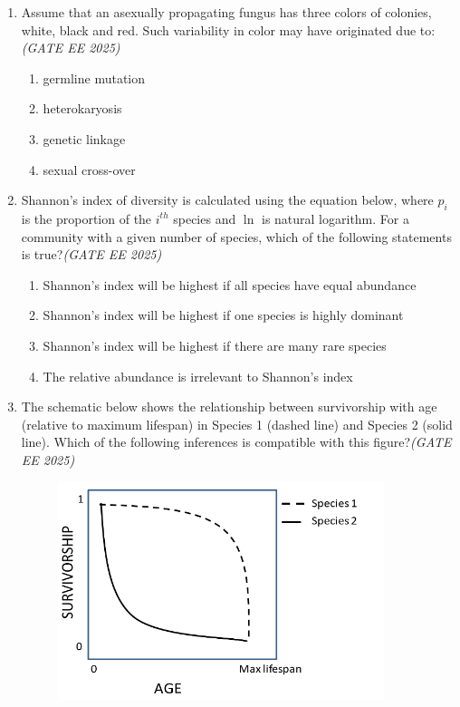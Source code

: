 \documentclass[11pt,a4paper]{article}
\begin{document}
\begin{enumerate}[leftmargin=*,label=\textbf{Q.\arabic*},resume]
\rule{4cm}{0.15mm}

\item Assume that an asexually propagating fungus has three colors of colonies, white, black and red. Such variability in color may have originated due to:\hfill \textit{(GATE EE 2025)}
\begin{multicols}{2}
\begin{enumerate}[label=(\Alph*)]
\item germline mutation
\item heterokaryosis
\item genetic linkage
\item sexual cross-over
\end{enumerate}
\end{multicols}

\item Shannon's index of diversity is calculated using the equation below, where $p_i$ is the proportion of the $i^{th}$ species and $\ln$ is natural logarithm. For a community with a given number of species, which of the following statements is true?\hfill \textit{(GATE EE 2025)}
\begin{multicols}{2}
\begin{enumerate}[label=(\Alph*)]
\item Shannon's index will be highest if all species have equal abundance
\item Shannon's index will be highest if one species is highly dominant
\item Shannon's index will be highest if there are many rare species
\item The relative abundance is irrelevant to Shannon's index
\end{enumerate}
\end{multicols}

\item The schematic below shows the relationship between survivorship with age (relative to maximum lifespan) in Species 1 (dashed line) and Species 2 (solid line). Which of the following inferences is compatible with this figure?\hfill \textit{(GATE EE 2025)}
\vspace{1em}
\begin{figure}[h!]
    \centering
    \includegraphics[width=0.9\textwidth]{imageQ52.png}
\end{figure}
\vspace{1em}



\end{enumerate}
\end{document}

